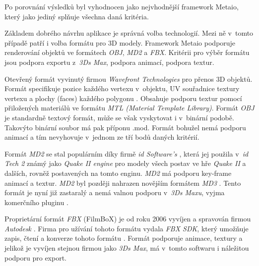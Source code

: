\documentclass[twoside,12pt]{article}
\begin{document}
Po porovnání výsledků byl vyhodnocen jako nejvhodnější framework Metaio, který jako jediný splňuje všechna daná kritéria.

Základem dobrého návrhu aplikace je správná volba technologií. Mezi ně v~tomto případě patří i volba formátu pro 3D modely. Framework Metaio podporuje renderování objektů ve formátech \textit{OBJ}, \textit{MD2} a \textit{FBX}. 
Kritérii pro výběr formátu jsou podpora exportu z~\textit{3Ds Max}, podpora animací, podpora textur.

Otevřený formát vyvinutý firmou \textit{Wavefront Technologies} pro přenos 3D objektů. Formát specifikuje pozice každého vertexu v~objektu, UV souřadnice textury vertexu a plochy (faces) každého polygonu \cite{obj_wiki}. Obsahuje podporu textur pomocí přiložených materiálů ve formátu \textit{MTL (Material Template Library)}. Formát \textit{OBJ} je standardně textový formát, může se však vyskytovat i v~binární podobě. Takovýto binární soubor má pak příponu .mod. Formát bohužel nemá podporu animací \cite{obj_doc} a tím nevyhovuje v~jednom ze tří bodů daných kritérií.

Formát \textit{MD2} se stal populárním díky firmě \textit{id Software's} \cite{md2_wiki}, která jej použila v~\textit{id Tech 2} známý jako \textit{Quake II engine} \cite{quake_engine} pro modely všech postav ve hře \textit{Quake II} a dalších, rovněž postavených na tomto enginu. \textit{MD2} má podporu key-frame animací a textur. \textit{MD2} byl později nahrazen novějším formátem \textit{MD3} \cite{id_tech_3_wiki}. Tento formát je nyní již zastaralý a nemá valnou podporu v~\textit{3Ds Maxu}, vyjma komerčního pluginu \cite{qtip_plugin}. 

Proprietární formát \textit{FBX} (FilmBoX) je od roku 2006 vyvíjen a spravován firmou \textit{Autodesk} \cite{autodesk_fbx}. Firma pro užívání tohoto formátu vydala \textit{FBX SDK}, který umožňuje zapis, čtení a konverze tohoto formátu \cite{autodesk_fbx_sdk}. Formát podporuje animace, textury a jelikož je vyvíjen stejnou firmou jako \textit{3Ds Max}, má v~tomto softwaru i náležitou podporu pro export.

\end{document}
